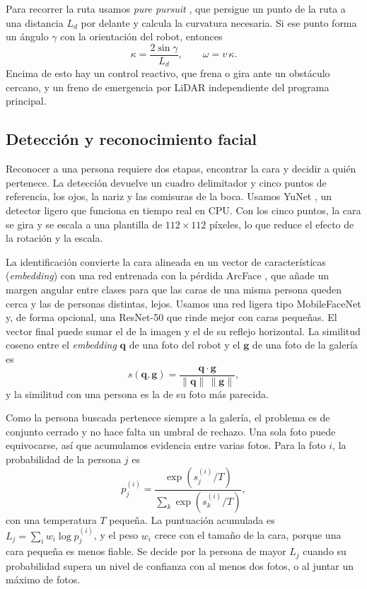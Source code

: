 \documentclass[11pt,a4paper]{article}
\begin{document}
Para recorrer la ruta usamos \textit{pure pursuit} \cite{coulter1992}, que persigue un punto de la ruta a una distancia $L_d$ por delante y calcula la curvatura necesaria. Si ese punto forma un ángulo $\gamma$ con la orientación del robot, entonces
\begin{equation}
  \kappa = \frac{2\sin\gamma}{L_d}, \qquad \omega = v\,\kappa .
\end{equation}
Encima de esto hay un control reactivo, que frena o gira ante un obstáculo cercano, y un freno de emergencia por LiDAR independiente del programa principal.

\subsection{Detección y reconocimiento facial}

Reconocer a una persona requiere dos etapas, encontrar la cara y decidir a quién pertenece. La detección devuelve un cuadro delimitador y cinco puntos de referencia, los ojos, la nariz y las comisuras de la boca. Usamos YuNet \cite{wu2023yunet}, un detector ligero que funciona en tiempo real en CPU. Con los cinco puntos, la cara se gira y se escala a una plantilla de $112\times112$ píxeles, lo que reduce el efecto de la rotación y la escala.

La identificación convierte la cara alineada en un vector de características (\textit{embedding}) con una red entrenada con la pérdida ArcFace \cite{deng2019arcface}, que añade un margen angular entre clases para que las caras de una misma persona queden cerca y las de personas distintas, lejos. Usamos una red ligera tipo MobileFaceNet \cite{chen2018mobilefacenets} y, de forma opcional, una ResNet-50 que rinde mejor con caras pequeñas. El vector final puede sumar el de la imagen y el de su reflejo horizontal. La similitud coseno entre el \textit{embedding} $\mathbf{q}$ de una foto del robot y el $\mathbf{g}$ de una foto de la galería es
\begin{equation}
  s(\mathbf{q},\mathbf{g}) = \frac{\mathbf{q}\cdot\mathbf{g}}{\lVert\mathbf{q}\rVert\,\lVert\mathbf{g}\rVert},
\end{equation}
y la similitud con una persona es la de su foto más parecida.

Como la persona buscada pertenece siempre a la galería, el problema es de conjunto cerrado y no hace falta un umbral de rechazo. Una sola foto puede equivocarse, así que acumulamos evidencia entre varias fotos. Para la foto $i$, la probabilidad de la persona $j$ es
\begin{equation}
  p^{(i)}_j = \frac{\exp\!\left(s^{(i)}_j/T\right)}{\sum_k \exp\!\left(s^{(i)}_k/T\right)},
\end{equation}
con una temperatura $T$ pequeña. La puntuación acumulada es $L_j = \sum_i w_i \log p^{(i)}_j$, y el peso $w_i$ crece con el tamaño de la cara, porque una cara pequeña es menos fiable. Se decide por la persona de mayor $L_j$ cuando su probabilidad supera un nivel de confianza con al menos dos fotos, o al juntar un máximo de fotos.
\end{document}
